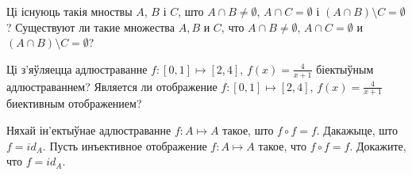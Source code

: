\begin{problemList}
\problemItemSimple
{Ці існуюць такія мноствы $A$, $B$ і $C$, што $A \cap B \neq \emptyset$, $A \cap C = \emptyset$ і $(A \cap B) \setminus C = \emptyset$?}
{Существуют ли такие множества $A, B$ и $C$, что $A \cap B \neq \emptyset$, $A \cap C = \emptyset$ и $(A \cap B) \setminus C = \emptyset$?}

\problemItemSimple
{Ці з'яўляецца адлюстраванне $f: [0, 1] \mapsto [2, 4]$, $f(x) = \frac{4}{x + 1}$ біектыўным адлюстраваннем?}
{Является ли отображение $f: [0, 1] \mapsto [2, 4]$, $f(x) = \frac{4}{x + 1}$ биективным отображением?}

\problemItemSimple
{Няхай ін'ектыўнае адлюстраванне $f: A \mapsto A$ такое, што $f \circ f = f$. Дакажыце, што $f = id_{A}$.}
{Пусть инъективное отображение $f: A \mapsto A$ такое, что $f \circ f = f$. Докажите, что $f = id_{A}$.}

\end{problemList}


